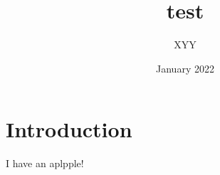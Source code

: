 \documentclass{article}
\title{test}
\author{XYY}
\date{January 2022}
\begin{document}
\maketitle

\section{Introduction}
I have an aplpple!
\end{document}
